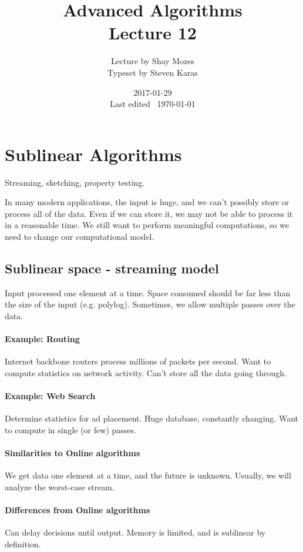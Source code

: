\documentclass[a4paper]{article}
\title{Advanced Algorithms\\\large Lecture 12}
\date{2017-01-29 \\ Last edited \currenttime\ \today}
\author{Lecture by Shay Mozes\\Typeset by Steven Karas}
\begin{document}
\maketitle

\section{Sublinear Algorithms}
Streaming, sketching, property testing.

In many modern applications, the input is huge, and we can't possibly store or process all of the data.
Even if we can store it, we may not be able to process it in a reasonable time.
We still want to perform meaningful computations, so we need to change our computational model.

\subsection{Sublinear space - streaming model}
Input processed one element at a time.
Space consumed should be far less than the size of the input (e.g. polylog).
Sometimes, we allow multiple passes over the data.

\paragraph{Example: Routing}
Internet backbone routers process millions of packets per second.
Want to compute statistics on network activity.
Can’t store all the data going through.

\paragraph{Example: Web Search}
Determine statistics for ad placement.
Huge database, constantly changing.
Want to compute in single (or few) passes.

\paragraph{Similarities to Online algorithms}
We get data one element at a time, and the future is unknown.
Usually, we will analyze the worst-case stream.

\paragraph{Differences from Online algorithms}
Can delay decisions until output.
Memory is limited, and is sublinear by definition.
\end{document}
